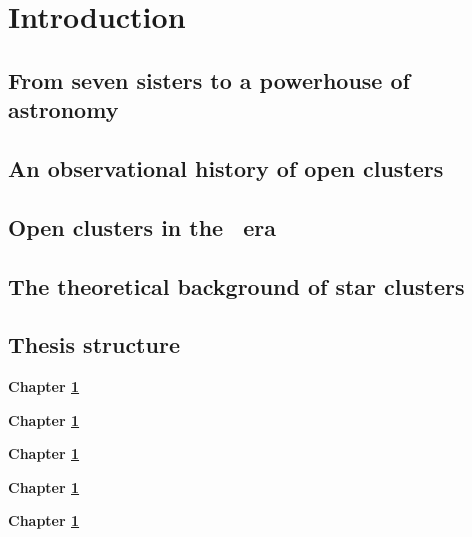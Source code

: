 %
\chapter{Introduction}
\label{sec:intro}


\section{From seven sisters to a powerhouse of astronomy}


\section{An observational history of open clusters}


\section{Open clusters in the \gaia\ era}


\section{The theoretical background of star clusters}


\section{Thesis structure}
\label{sec:intro:structure}

\textbf{Chapter \ref{sec:intro}} \\[0.2em]
\blindtext

\textbf{Chapter \ref{sec:intro}} \\[0.2em]
\blindtext

\textbf{Chapter \ref{sec:intro}} \\[0.2em]
\blindtext

\textbf{Chapter \ref{sec:intro}} \\[0.2em]
\blindtext

\textbf{Chapter \ref{sec:intro}} \\[0.2em]
\blindtext
